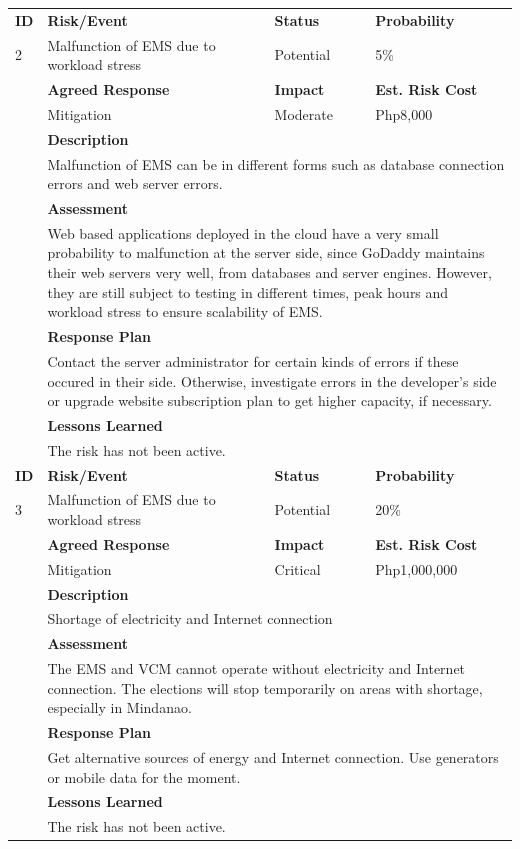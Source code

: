 \documentclass[a4paper, 11pt]{article}
\begin{document}
\begin{table}[H]
\begin{tabular}{l|l l l}
		\textbf{ID} & \textbf{Risk/Event} & \textbf{Status} & \textbf{Probability}\\
		2 & Malfunction of EMS due to workload stress & Potential & 5\% \\
		& \textbf{Agreed Response} & \textbf{Impact} & \textbf{Est. Risk Cost} \\
		& Mitigation & Moderate & Php8,000 \\
		& \textbf{Description} \\
		& \multicolumn{3}{p{\linewidth}}{Malfunction of EMS can be in different forms such as database connection errors and web server errors.} \\
		& \textbf{Assessment} \\
		& \multicolumn{3}{p{\linewidth}}{Web based applications deployed in the cloud have a very small probability to malfunction at the server side, since GoDaddy maintains their web servers very well, from databases and server engines. However, they are still subject to testing in different times, peak hours and workload stress to ensure scalability of EMS.} \\
		& \textbf{Response Plan} \\
		& \multicolumn{3}{p{\linewidth}}{Contact the server administrator for certain kinds of errors if these occured in their side. Otherwise, investigate errors in the developer's side or upgrade website subscription plan to get higher capacity, if necessary.} \\
		& \textbf{Lessons Learned} \\
		& The risk has not been active. \\
		\hline
		
		\textbf{ID} & \textbf{Risk/Event} & \textbf{Status} & \textbf{Probability}\\
		3 & Malfunction of EMS due to workload stress & Potential & 20\% \\
		& \textbf{Agreed Response} & \textbf{Impact} & \textbf{Est. Risk Cost} \\
		& Mitigation & Critical & Php1,000,000 \\
		& \textbf{Description} \\
		& \multicolumn{3}{p{\linewidth}}{Shortage of electricity and Internet connection} \\
		& \textbf{Assessment} \\
		& \multicolumn{3}{p{\linewidth}}{The EMS and VCM cannot operate without electricity and Internet connection. The elections will stop temporarily on areas with shortage, especially in Mindanao.} \\
		& \textbf{Response Plan} \\
		& \multicolumn{3}{p{\linewidth}}{Get alternative sources of energy and Internet connection. Use generators or mobile data for the moment.} \\
		& \textbf{Lessons Learned} \\
		& The risk has not been active. \\
	\end{tabular}
\end{table}
\end{document}
